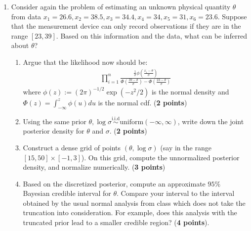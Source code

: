 \documentclass{scrartcl}
\begin{document}
\begin{enumerate}
\item Consider again the problem of estimating an unknown physical
  quantity $\theta$ from data $x_1 = 26.6, x_2 = 38.5, x_3 = 34.4,
  x_4 = 34, x_5 = 31, x_6 = 23.6$. Suppose that the measurement device
  can only record observations if they are in the range $[23,
  39]$. Based on this information and the data, what can be inferred
  about $\theta$?
\begin{enumerate}
\item Argue that the likelihood now should be: 
  \begin{align*}
    \prod_{i=1}^n \frac{\frac{1}{\sigma}
    \phi\left(\frac{x_i-\theta}{\sigma} \right)}{\Phi\left(\frac{39 -
    \theta}{\sigma} \right) - \Phi\left(\frac{23 -
    \theta}{\sigma} \right)}
  \end{align*}
  where $\phi(z) := (2 \pi)^{-1/2}\exp(-z^2/2)$ is the normal density
  and $\Phi(z) = \int_{-\infty}^z \phi(u) du$ is the normal
  cdf. (\textbf{2 points})
\item Using the same prior $\theta, \log \sigma
  \overset{\text{i.i.d}}{\sim} \text{uniform}(-\infty, \infty)$, write
  down the joint posterior density for $\theta$ and
  $\sigma$. (\textbf{2 points})
\item Construct a dense grid of points $(\theta, \log \sigma)$ (say in
  the range $[15, 50] \times [-1, 3]$). On this grid, compute the
  unnormalized posterior density, and normalize
  numerically. (\textbf{3 points})
\item Based on the discretized posterior, compute an approximate
  $95\%$ Bayesian credible interval for $\theta$. Compare your
  interval to the interval obtained by the usual normal analysis from
  class which does not take the truncation into consideration. For
  example, does this analysis with the truncated prior lead to a
  smaller credible region? (\textbf{4 points}). 
\end{enumerate}


\end{enumerate}
\end{document}
